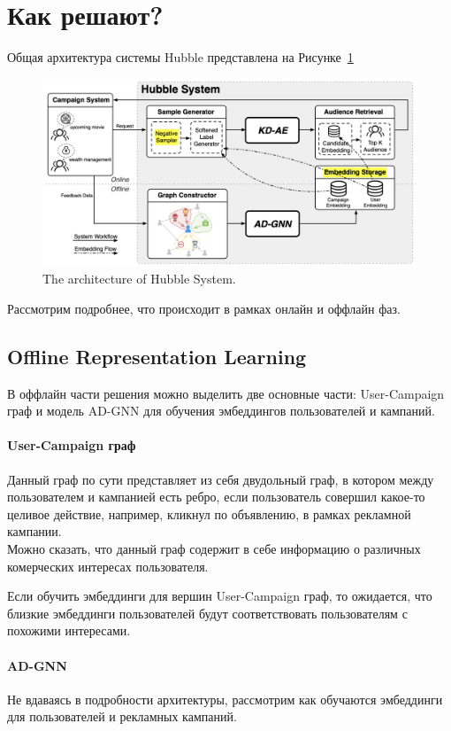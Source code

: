 \section*{Как решают?}

Общая архитектура системы Hubble представлена на Рисунке~\ref{fig:hubble}

\begin{figure}[ht]
    \centering
    \includegraphics[width=0.8\linewidth]{images/hubble.png}
    \caption{\footnotesize{The architecture of Hubble System.}}
    \label{fig:hubble}
\end{figure}

Рассмотрим подробнее, что происходит в рамках онлайн и оффлайн фаз.

\subsection*{Offline Representation Learning}

В оффлайн части решения можно выделить две основные части: User-Campaign граф и модель AD-GNN для обучения эмбеддингов пользователей и кампаний.

\paragraph{User-Campaign граф} Данный граф по сути представляет из себя двудольный граф, в котором между пользователем и кампанией есть ребро, если пользователь совершил какое-то целивое действие, например, кликнул по объявлению, в рамках рекламной кампании. \\

Можно сказать, что данный граф содержит в себе информацию о различных комерческих интересах пользователя.

Если обучить эмбеддинги для вершин User-Campaign граф, то ожидается, что близкие эмбеддинги пользователей будут соответствовать пользователям с похожими интересами.

\paragraph{AD-GNN} Не вдаваясь в подробности архитектуры, рассмотрим как обучаются эмбеддинги для пользователей и рекламных кампаний. \\

